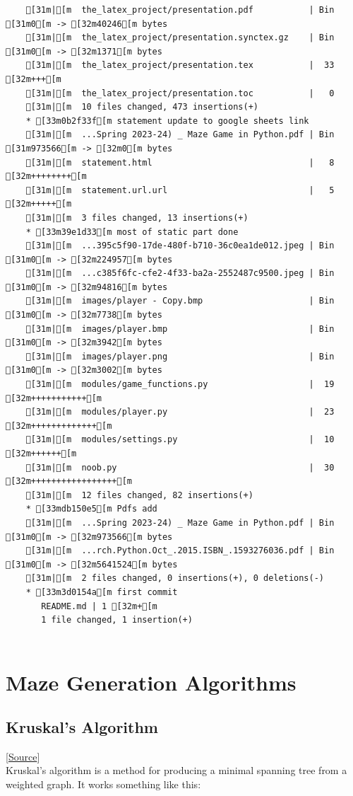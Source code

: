 \documentclass{article}
\begin{document}
{\begin{verbatim}
    [31m|[m  the_latex_project/presentation.pdf           | Bin [31m0[m -> [32m40246[m bytes
    [31m|[m  the_latex_project/presentation.synctex.gz    | Bin [31m0[m -> [32m1371[m bytes
    [31m|[m  the_latex_project/presentation.tex           |  33 [32m+++[m
    [31m|[m  the_latex_project/presentation.toc           |   0
    [31m|[m  10 files changed, 473 insertions(+)
    * [33m0b2f33f[m statement update to google sheets link
    [31m|[m  ...Spring 2023-24) _ Maze Game in Python.pdf | Bin [31m973566[m -> [32m0[m bytes
    [31m|[m  statement.html                               |   8 [32m++++++++[m
    [31m|[m  statement.url.url                            |   5 [32m+++++[m
    [31m|[m  3 files changed, 13 insertions(+)
    * [33m39e1d33[m most of static part done
    [31m|[m  ...395c5f90-17de-480f-b710-36c0ea1de012.jpeg | Bin [31m0[m -> [32m224957[m bytes
    [31m|[m  ...c385f6fc-cfe2-4f33-ba2a-2552487c9500.jpeg | Bin [31m0[m -> [32m94816[m bytes
    [31m|[m  images/player - Copy.bmp                     | Bin [31m0[m -> [32m7738[m bytes
    [31m|[m  images/player.bmp                            | Bin [31m0[m -> [32m3942[m bytes
    [31m|[m  images/player.png                            | Bin [31m0[m -> [32m3002[m bytes
    [31m|[m  modules/game_functions.py                    |  19 [32m+++++++++++[m
    [31m|[m  modules/player.py                            |  23 [32m+++++++++++++[m
    [31m|[m  modules/settings.py                          |  10 [32m++++++[m
    [31m|[m  noob.py                                      |  30 [32m+++++++++++++++++[m
    [31m|[m  12 files changed, 82 insertions(+)
    * [33mdb150e5[m Pdfs add
    [31m|[m  ...Spring 2023-24) _ Maze Game in Python.pdf | Bin [31m0[m -> [32m973566[m bytes
    [31m|[m  ...rch.Python.Oct_.2015.ISBN_.1593276036.pdf | Bin [31m0[m -> [32m5641524[m bytes
    [31m|[m  2 files changed, 0 insertions(+), 0 deletions(-)
    * [33m3d0154a[m first commit
       README.md | 1 [32m+[m
       1 file changed, 1 insertion(+)
    
\end{verbatim}

\section{Maze Generation Algorithms}
\label{maze_algs}
\subsection{Kruskal's Algorithm}
[\href{https://weblog.jamisbuck.org/2011/1/3/maze-generation-kruskal-s-algorithm}{Source}]\\
Kruskal's algorithm is a method for producing a minimal spanning tree from a weighted graph. It works something like this:

}
\end{document}

